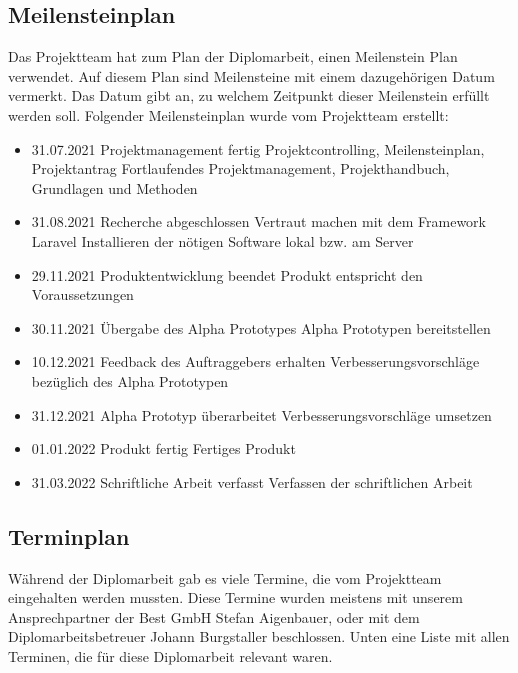 \subsection{Meilensteinplan}
Das Projektteam hat zum Plan der Diplomarbeit, einen Meilenstein Plan verwendet. Auf diesem Plan sind Meilensteine mit einem dazugehörigen Datum vermerkt. Das Datum gibt an, zu welchem Zeitpunkt dieser Meilenstein erfüllt werden soll. Folgender Meilensteinplan wurde vom Projektteam erstellt: 
\begin{itemize}
\item 31.07.2021 Projektmanagement fertig
	\subitem Projektcontrolling, Meilensteinplan, Projektantrag
	\subitem Fortlaufendes Projektmanagement, Projekthandbuch, 
	\subitem Grundlagen und Methoden 
	\item 31.08.2021 Recherche abgeschlossen
	\subitem Vertraut machen mit dem Framework Laravel
	\subitem Installieren der nötigen Software lokal bzw. am Server
	\item 29.11.2021 Produktentwicklung beendet
	\subitem Produkt entspricht den Voraussetzungen
	\item 30.11.2021 Übergabe des Alpha Prototypes
	\subitem Alpha Prototypen bereitstellen
	\item 10.12.2021 Feedback des Auftraggebers erhalten
	\subitem Verbesserungsvorschläge bezüglich des Alpha Prototypen
	\item 31.12.2021 Alpha Prototyp überarbeitet
	\subitem Verbesserungsvorschläge umsetzen
	\item 01.01.2022 Produkt fertig
	\subitem Fertiges Produkt
	\item 31.03.2022 Schriftliche Arbeit verfasst
	\subitem Verfassen der schriftlichen Arbeit
\end{itemize}

























\newpage
\subsection{Terminplan}
Während der Diplomarbeit gab es viele Termine, die vom Projektteam eingehalten werden mussten. Diese Termine wurden meistens mit unserem Ansprechpartner der Best GmbH Stefan Aigenbauer, oder mit dem Diplomarbeitsbetreuer Johann Burgstaller beschlossen.
Unten eine Liste mit allen Terminen, die für diese Diplomarbeit relevant waren.

